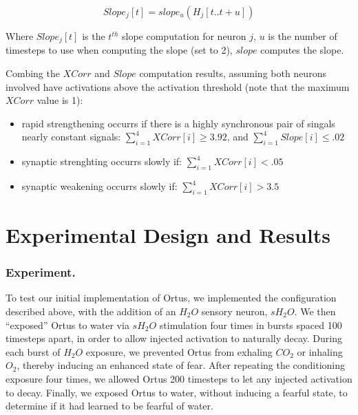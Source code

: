 \documentclass[letterpaper]{article}
\begin{document}
\begin{equation}
    \label{eq:slope}
    Slope_j[t] =  slope_u(H_{j}[t..t+u])
\end{equation}

Where $Slope_j[t]$ is the $t^{th}$ slope computation for neuron $j$, $u$ is the number of timesteps to use when computing the slope (set to 2), $slope$ computes the slope.

Combing the $XCorr$ and $Slope$ computation results, assuming both neurons involved have activations above the activation threshold (note that the maximum $XCorr$ value is 1):

\begin{itemize}
    \itemsep0em
    \item rapid strengthening occurrs if there is a highly synchronous pair of singals nearly constant signals:
        \subitem $\sum_{i=1}^{4}{ XCorr[i]} \ge 3.92$, and
        \subitem $\sum_{i=1}^{4}{ Slope[i]} \le .02$
    \item synaptic strenghting occurrs slowly if:
        \subitem $\sum_{i=1}^{4}{ XCorr[i]} < .05$
    \item synaptic weakening occurrs slowly if:
        \subitem $\sum_{i=1}^{4}{ XCorr[i]} > 3.5$
\end{itemize}

\section{Experimental Design and Results}

\subsubsection{Experiment.} To test our initial implementation of Ortus, we implemented the configuration described above, with the addition of an $H_2O$ sensory neuron, $sH_2O$.
We then ``exposed'' Ortus to water via $sH_2O$ stimulation four times in bursts spaced 100 timesteps apart, in order to allow injected activation to naturally decay.
During each burst of $H_2O$ exposure, we prevented Ortus from exhaling $CO_2$ or inhaling $O_2$, thereby inducing an enhanced state of fear.
After repeating the conditioning exposure four times, we allowed Ortus 200 timesteps to let any injected activation to decay.
Finally, we exposed Ortus to water, without inducing a fearful state, to determine if it had learned to be fearful of water.
\end{document}
